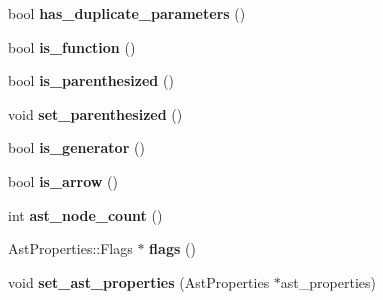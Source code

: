 \begin{DoxyCompactItemize}
\item 
\hypertarget{classv8_1_1internal_1_1_v8___f_i_n_a_l_ab8ac71879205e06104b179bb695ca30d}{}bool {\bfseries has\+\_\+duplicate\+\_\+parameters} ()\label{classv8_1_1internal_1_1_v8___f_i_n_a_l_ab8ac71879205e06104b179bb695ca30d}

\item 
\hypertarget{classv8_1_1internal_1_1_v8___f_i_n_a_l_aff57a7da264079d86e5744d9bd488554}{}bool {\bfseries is\+\_\+function} ()\label{classv8_1_1internal_1_1_v8___f_i_n_a_l_aff57a7da264079d86e5744d9bd488554}

\item 
\hypertarget{classv8_1_1internal_1_1_v8___f_i_n_a_l_a2dac55f7c8c0084c74878644974cb135}{}bool {\bfseries is\+\_\+parenthesized} ()\label{classv8_1_1internal_1_1_v8___f_i_n_a_l_a2dac55f7c8c0084c74878644974cb135}

\item 
\hypertarget{classv8_1_1internal_1_1_v8___f_i_n_a_l_ada063b3f50a24e4ddd71f80c8777edb8}{}void {\bfseries set\+\_\+parenthesized} ()\label{classv8_1_1internal_1_1_v8___f_i_n_a_l_ada063b3f50a24e4ddd71f80c8777edb8}

\item 
\hypertarget{classv8_1_1internal_1_1_v8___f_i_n_a_l_a19e2595ea18fd5abd5d31bd0dac7822b}{}bool {\bfseries is\+\_\+generator} ()\label{classv8_1_1internal_1_1_v8___f_i_n_a_l_a19e2595ea18fd5abd5d31bd0dac7822b}

\item 
\hypertarget{classv8_1_1internal_1_1_v8___f_i_n_a_l_a2981155cad2252650989675075cb063f}{}bool {\bfseries is\+\_\+arrow} ()\label{classv8_1_1internal_1_1_v8___f_i_n_a_l_a2981155cad2252650989675075cb063f}

\item 
\hypertarget{classv8_1_1internal_1_1_v8___f_i_n_a_l_ad7b334a90062c20e66de1005f55043e5}{}int {\bfseries ast\+\_\+node\+\_\+count} ()\label{classv8_1_1internal_1_1_v8___f_i_n_a_l_ad7b334a90062c20e66de1005f55043e5}

\item 
\hypertarget{classv8_1_1internal_1_1_v8___f_i_n_a_l_a4cc6628cf6f5a91c60e05cb2e517f7f9}{}Ast\+Properties\+::\+Flags $\ast$ {\bfseries flags} ()\label{classv8_1_1internal_1_1_v8___f_i_n_a_l_a4cc6628cf6f5a91c60e05cb2e517f7f9}

\item 
\hypertarget{classv8_1_1internal_1_1_v8___f_i_n_a_l_afa60822ab82453b7eebc065dc790dfd8}{}void {\bfseries set\+\_\+ast\+\_\+properties} (Ast\+Properties $\ast$ast\+\_\+properties)\label{classv8_1_1internal_1_1_v8___f_i_n_a_l_afa60822ab82453b7eebc065dc790dfd8}


\end{DoxyCompactItemize}
